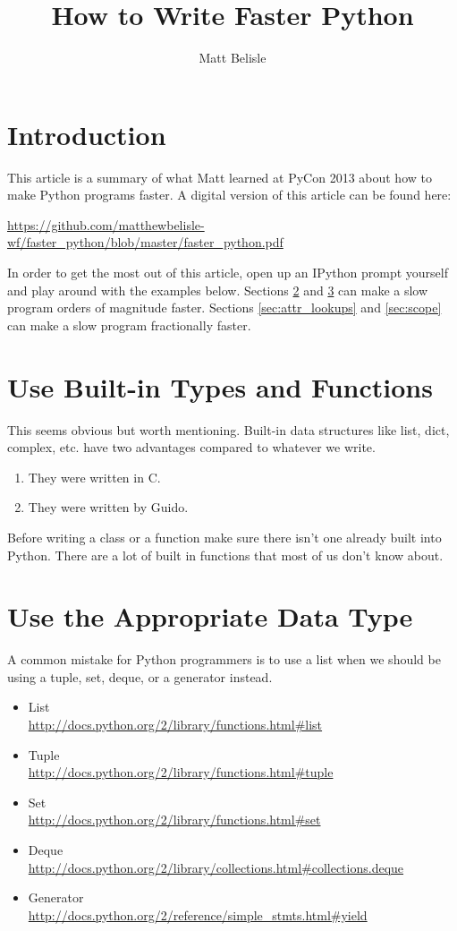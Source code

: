 \documentclass{article}
\begin{document}
\title{How to Write Faster Python}
\author{Matt Belisle}
\maketitle
\tableofcontents
\pagebreak
\section{Introduction}
This article is a summary of what Matt learned at PyCon 2013 about how
to make Python programs faster.  A digital version of this article can
be found here:

\bigskip\noindent
\url{https://github.com/matthewbelisle-wf/faster_python/blob/master/faster_python.pdf}
\bigskip

\noindent In order to get the most out of this article, open up an
IPython prompt yourself and play around with the examples below.
Sections \ref{sec:builtin_types} and \ref{sec:appropriate_types} can
make a slow program orders of magnitude faster.  Sections
\ref{sec:attr_lookups} and \ref{sec:scope} can make a slow
program fractionally faster.
\section{Use Built-in Types and Functions}\label{sec:builtin_types}
This seems obvious but worth mentioning.  Built-in data structures
like list, dict, complex, etc. have two advantages compared to
whatever we write.
\begin{enumerate}
  \item They were written in C.
  \item They were written by Guido.
\end{enumerate}
Before writing a class or a function make sure there isn't one already
built into Python.  There are a lot of built in functions that most of
us don't know about.
\section{Use the Appropriate Data Type}\label{sec:appropriate_types}
A common mistake for Python programmers is to use a list when we
should be using a tuple, set, deque, or a generator instead.
\begin{itemize}
  \item List\\\url{http://docs.python.org/2/library/functions.html#list}
  \item Tuple\\\url{http://docs.python.org/2/library/functions.html#tuple}
  \item Set\\\url{http://docs.python.org/2/library/functions.html#set}
  \item Deque\\\url{http://docs.python.org/2/library/collections.html#collections.deque}
  \item Generator\\\url{http://docs.python.org/2/reference/simple_stmts.html#yield}
\end{itemize}
\end{document}
